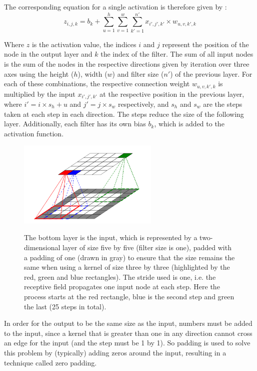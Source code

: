 The corresponding equation for a single activation is therefore given by \cite [p. 453]{Geron2019}:
\begin{equation}
z_{i,j,k} = b_k + \sum_{u=1}^{h} \sum_{v=1}^{w} \sum_{k'=1}^{n'} x_{i', j', k'} \times w_{u, v, k', k} 
\end{equation}

Where $z$ is the activation value, the indices $i$ and $j$ represent the position of the node in the output layer and $k$ the index of the filter.
The sum of all input nodes is the sum of the nodes in the respective directions given by iteration over three axes using the height ($h$), width ($w$) and filter size ($n'$) of the previous layer.
For each of these combinations, the respective connection weight $w_{u, v, k', k}$ is multiplied by the input $x_{i', j', k'}$ at the respective position in the previous layer, where $i' = i \times s_h + u$ and $j' = j \times s_w$ respectively, and $s_h$ and $s_w$ are the steps taken at each step in each direction. The steps reduce the size of the following layer.
Additionally, each filter has its own bias $b_k$, which is added to the activation function.

\begin{figure}
    \centering
    \caption{  The bottom layer is the input, which is represented by a two-dimensional layer of size five by five (filter size is one), padded with a padding of one (drawn in gray) to ensure that the size remains the same when using a kernel of size three by three (highlighted by the red, green and blue rectangles). The stride used is one, i.e. the receptive field propagates one input node at each step. Here the process starts at the red rectangle, blue is the second step and green the last (25 steps in total). }
    \includegraphics[width=0.6\textwidth]{images/conv_layer.png}
    \label{fig:conv_layer}
\end{figure}

In order for the output to be the same size as the input, numbers must be added to the input, since a kernel that is greater than one in any direction cannot cross an edge for the input (and the step must be 1 by 1).
So padding is used to solve this problem by (typically) adding zeros around the input, resulting in a technique called zero padding.

